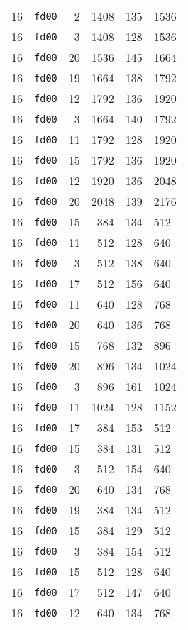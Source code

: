 \documentclass{article}
\begin{document}
\begin{table}[h!]
\begin{tabular}{llrrrl}
    16 & \texttt{fd00} & 2 & 1408 & 135 & 1536 \\
    16 & \texttt{fd00} & 3 & 1408 & 128 & 1536 \\
    16 & \texttt{fd00} & 20 & 1536 & 145 & 1664 \\
    16 & \texttt{fd00} & 19 & 1664 & 138 & 1792 \\
    16 & \texttt{fd00} & 12 & 1792 & 136 & 1920 \\
    16 & \texttt{fd00} & 3 & 1664 & 140 & 1792 \\
    16 & \texttt{fd00} & 11 & 1792 & 128 & 1920 \\
    16 & \texttt{fd00} & 15 & 1792 & 136 & 1920 \\
    16 & \texttt{fd00} & 12 & 1920 & 136 & 2048 \\
    16 & \texttt{fd00} & 20 & 2048 & 139 & 2176 \\
    16 & \texttt{fd00} & 15 & 384 & 134 & 512 \\
    16 & \texttt{fd00} & 11 & 512 & 128 & 640 \\
    16 & \texttt{fd00} & 3 & 512 & 138 & 640 \\
    16 & \texttt{fd00} & 17 & 512 & 156 & 640 \\
    16 & \texttt{fd00} & 11 & 640 & 128 & 768 \\
    16 & \texttt{fd00} & 20 & 640 & 136 & 768 \\
    16 & \texttt{fd00} & 15 & 768 & 132 & 896 \\
    16 & \texttt{fd00} & 20 & 896 & 134 & 1024 \\
    16 & \texttt{fd00} & 3 & 896 & 161 & 1024 \\
    16 & \texttt{fd00} & 11 & 1024 & 128 & 1152 \\
    16 & \texttt{fd00} & 17 & 384 & 153 & 512 \\
    16 & \texttt{fd00} & 15 & 384 & 131 & 512 \\
    16 & \texttt{fd00} & 3 & 512 & 154 & 640 \\
    16 & \texttt{fd00} & 20 & 640 & 134 & 768 \\
    16 & \texttt{fd00} & 19 & 384 & 134 & 512 \\
    16 & \texttt{fd00} & 15 & 384 & 129 & 512 \\
    16 & \texttt{fd00} & 3 & 384 & 154 & 512 \\
    16 & \texttt{fd00} & 15 & 512 & 128 & 640 \\
    16 & \texttt{fd00} & 17 & 512 & 147 & 640 \\
    16 & \texttt{fd00} & 12 & 640 & 134 & 768 \\

\end{tabular}
\end{table}
\end{document}
